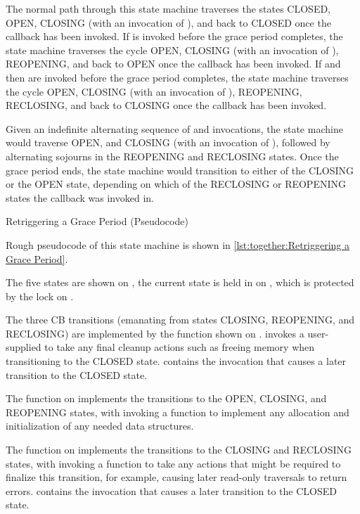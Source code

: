 The normal path through this state machine traverses the states CLOSED,
OPEN, CLOSING (with an invocation of ), and back to CLOSED
once the callback has been invoked.
If  is invoked before the grace period completes, the
state machine traverses the cycle OPEN, CLOSING (with
an invocation of ), REOPENING, and back to OPEN once the
callback has been invoked.
If  and then  are invoked before the grace period
completes, the state machine traverses the cycle OPEN, CLOSING (with
an invocation of ), REOPENING, RECLOSING, and back to CLOSING once the
callback has been invoked.

Given an indefinite alternating sequence of  and 
invocations, the state machine would traverse OPEN, and CLOSING (with
an invocation of ), followed by alternating sojourns in
the REOPENING and RECLOSING states.
Once the grace period ends, the state machine would transition to
either of the CLOSING or the OPEN state, depending on which of the
RECLOSING or REOPENING states the callback was invoked in.

\begin{listing}
\caption{Retriggering a Grace Period (Pseudocode)}
\label{lst:together:Retriggering a Grace Period}
\end{listing}

Rough pseudocode of this state machine is shown in
\cref{lst:together:Retriggering a Grace Period}.
\begin{fcvref}
The five states are shown on ,
the current state is held in  on ,
which is protected by the lock on .

The three CB transitions (emanating from states CLOSING, REOPENING,
and RECLOSING) are implemented by the  function shown
on .
 invokes a user-supplied  to
take any final cleanup actions such as freeing memory when
transitioning to the CLOSED state.
 contains the  invocation that
causes a later transition to the CLOSED state.

The  function on  implements
the transitions to the OPEN, CLOSING, and REOPENING states, with
 invoking a  function to implement
any allocation and initialization of any needed data structures.

The  function on 
implements the transitions to the CLOSING and RECLOSING states,
with  invoking a  function to take
any actions that might be required to finalize this transition,
for example, causing later read-only traversals to return errors.
 contains the  invocation that
causes a later transition to the CLOSED state.
\end{fcvref}

